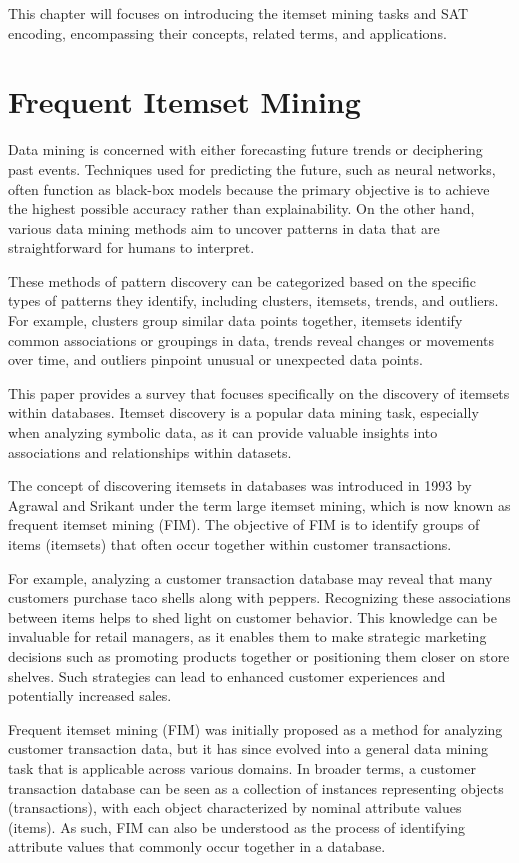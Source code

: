 This chapter will focuses on introducing the itemset mining tasks and SAT encoding, encompassing their concepts, related terms, and applications.
\section{Frequent Itemset Mining}

Data mining is concerned with either forecasting future trends or deciphering past events. Techniques used for predicting the future, such as neural networks, often function as black-box models because the primary objective is to achieve the highest possible accuracy rather than explainability. On the other hand, various data mining methods aim to uncover patterns in data that are straightforward for humans to interpret.

These methods of pattern discovery can be categorized based on the specific types of patterns they identify, including clusters, itemsets, trends, and outliers. For example, clusters group similar data points together, itemsets identify common associations or groupings in data, trends reveal changes or movements over time, and outliers pinpoint unusual or unexpected data points.

This paper provides a survey that focuses specifically on the discovery of itemsets within databases. Itemset discovery is a popular data mining task, especially when analyzing symbolic data, as it can provide valuable insights into associations and relationships within datasets.

The concept of discovering itemsets in databases was introduced in 1993 by Agrawal and Srikant under the term large itemset mining, which is now known as frequent itemset mining (FIM). The objective of FIM is to identify groups of items (itemsets) that often occur together within customer transactions.

For example, analyzing a customer transaction database may reveal that many customers purchase taco shells along with peppers. Recognizing these associations between items helps to shed light on customer behavior. This knowledge can be invaluable for retail managers, as it enables them to make strategic marketing decisions such as promoting products together or positioning them closer on store shelves. Such strategies can lead to enhanced customer experiences and potentially increased sales.

Frequent itemset mining (FIM) was initially proposed as a method for analyzing customer transaction data, but it has since evolved into a general data mining task that is applicable across various domains. In broader terms, a customer transaction database can be seen as a collection of instances representing objects (transactions), with each object characterized by nominal attribute values (items). As such, FIM can also be understood as the process of identifying attribute values that commonly occur together in a database.

